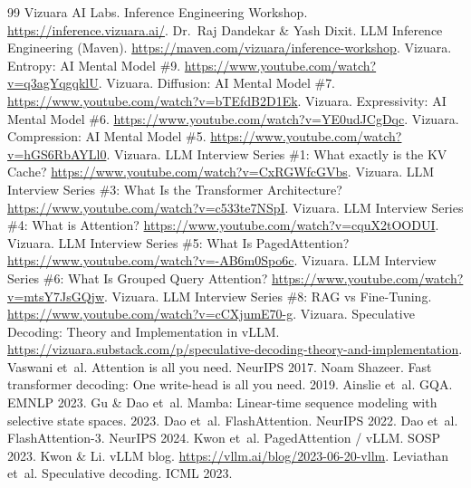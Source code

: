 \documentclass[11pt,a4paper]{article}
\begin{document}
\begin{thebibliography}{99}
 Vizuara AI Labs. Inference Engineering Workshop. \url{https://inference.vizuara.ai/}.
 Dr.~Raj Dandekar \& Yash Dixit. LLM Inference Engineering (Maven). \url{https://maven.com/vizuara/inference-workshop}.
 Vizuara. Entropy: AI Mental Model \#9. \url{https://www.youtube.com/watch?v=q3agYqgqklU}.
 Vizuara. Diffusion: AI Mental Model \#7. \url{https://www.youtube.com/watch?v=bTEfdB2D1Ek}.
 Vizuara. Expressivity: AI Mental Model \#6. \url{https://www.youtube.com/watch?v=YE0udJCgDqc}.
 Vizuara. Compression: AI Mental Model \#5. \url{https://www.youtube.com/watch?v=hGS6RbAYLl0}.
 Vizuara. LLM Interview Series \#1: What exactly is the KV Cache? \url{https://www.youtube.com/watch?v=CxRGWfcGVbs}.
 Vizuara. LLM Interview Series \#3: What Is the Transformer Architecture? \url{https://www.youtube.com/watch?v=c533te7NSpI}.
 Vizuara. LLM Interview Series \#4: What is Attention? \url{https://www.youtube.com/watch?v=cquX2tOODUI}.
 Vizuara. LLM Interview Series \#5: What Is PagedAttention? \url{https://www.youtube.com/watch?v=-AB6m0Spo6c}.
 Vizuara. LLM Interview Series \#6: What Is Grouped Query Attention? \url{https://www.youtube.com/watch?v=mtsY7JsGQjw}.
 Vizuara. LLM Interview Series \#8: RAG vs Fine-Tuning. \url{https://www.youtube.com/watch?v=cCXjumE70-g}.
 Vizuara. Speculative Decoding: Theory and Implementation in vLLM. \url{https://vizuara.substack.com/p/speculative-decoding-theory-and-implementation}.
 Vaswani et~al. Attention is all you need. NeurIPS 2017.
 Noam Shazeer. Fast transformer decoding: One write-head is all you need. 2019.
 Ainslie et~al. GQA. EMNLP 2023.
 Gu \& Dao et~al. Mamba: Linear-time sequence modeling with selective state spaces. 2023.
 Dao et~al. FlashAttention. NeurIPS 2022.
 Dao et~al. FlashAttention-3. NeurIPS 2024.
 Kwon et~al. PagedAttention / vLLM. SOSP 2023.
 Kwon \& Li. vLLM blog. \url{https://vllm.ai/blog/2023-06-20-vllm}.
 Leviathan et~al. Speculative decoding. ICML 2023.
\end{thebibliography}
\end{document}
